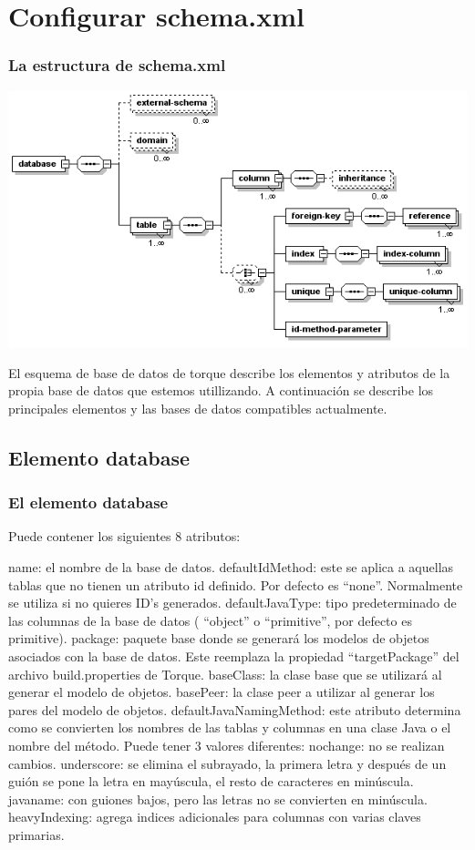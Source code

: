 \documentclass[24pt, a4paper, oneside, spanish]{beamer}
\begin{document}
\section{Configurar schema.xml}
	\begin{frame}
		\frametitle{La estructura de schema.xml}
		
		\begin{center}
			\includegraphics[scale=.4]{img/xml-config.png}
		\end{center}
	
		El esquema de base de datos de torque describe los elementos y atributos de la propia base de datos que estemos 			utillizando. A continuación se describe los principales elementos y las bases de datos compatibles actualmente.
	\end{frame}	
	
	\subsection{Elemento database}
		\begin{frame}[allowframebreaks]
			\frametitle{El elemento database}
			\setbeamercovered{invisible}
			
			Puede contener los siguientes 8 atributos:

			name: el nombre de la base de datos.
			defaultIdMethod: este se aplica a aquellas tablas que no tienen un atributo id definido. Por defecto es “none”. 			Normalmente se utiliza si no quieres ID’s generados.
			defaultJavaType: tipo predeterminado de las columnas de la base de datos ( “object” o “primitive”, por defecto es primitive).
			package: paquete base donde se generará los modelos de objetos asociados con la base de datos. Este reemplaza la propiedad “targetPackage” del archivo build.properties de Torque.
			baseClass: la clase base que se utilizará al generar el modelo de objetos.
			basePeer: la clase peer a utilizar al generar los pares del modelo de objetos.
			defaultJavaNamingMethod: este atributo determina como se convierten los nombres de las tablas y columnas en una clase Java o el nombre del método. Puede tener 3 valores diferentes:
			nochange: no se realizan cambios.
			underscore: se elimina el subrayado, la primera letra y después de un guión se pone la letra en mayúscula, el resto de caracteres en minúscula.
			javaname: con guiones bajos, pero las letras no se convierten en minúscula.
			heavyIndexing: agrega indices adicionales para columnas con varias claves primarias.
		\end{frame}
\end{document}
